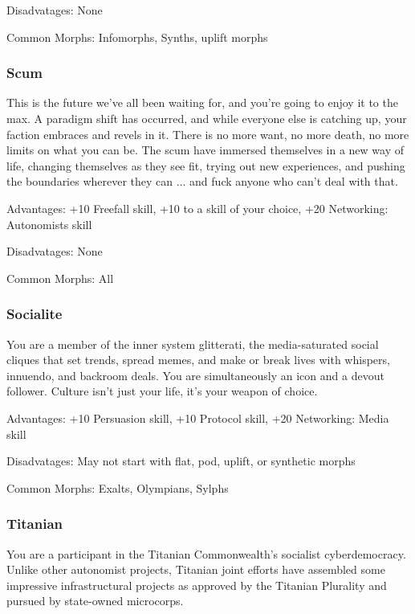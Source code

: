 Disadvatages: None

Common Morphs: Infomorphs, Synths, uplift morphs

\subsubsection{Scum}
\label{sec:background-scum}

This is the future we’ve all been waiting for, and you’re going to enjoy it to the max. A paradigm shift has occurred, and while everyone else is catching up, your faction embraces and revels in it. There is no more want, no more death, no more limits on what you can be. The scum have immersed themselves in a new way of life, changing themselves as they see fit, trying out new experiences, and pushing the boundaries wherever they can ... and fuck anyone who can’t deal with that.

Advantages: +10 Freefall skill, +10 to a skill of your choice, +20 Networking: Autonomists skill

Disadvatages: None

Common Morphs: All

\subsubsection{Socialite}
\label{sec:socialite}
You are a member of the inner system glitterati, the media-saturated social cliques that set trends, spread memes, and make or break lives with whispers, innuendo, and backroom deals. You are simultaneously an icon and a devout follower. Culture isn’t just your life, it’s your weapon of choice.

Advantages: +10 Persuasion skill, +10 Protocol skill, +20 Networking: Media skill

Disadvatages: May not start with flat, pod, uplift, or synthetic morphs

Common Morphs: Exalts, Olympians, Sylphs

\subsubsection{Titanian}
\label{sec:titanian}

You are a participant in the Titanian Commonwealth’s socialist cyberdemocracy. Unlike other autonomist projects, Titanian joint efforts have assembled some impressive infrastructural projects as approved by the Titanian Plurality and pursued by state-owned microcorps.

